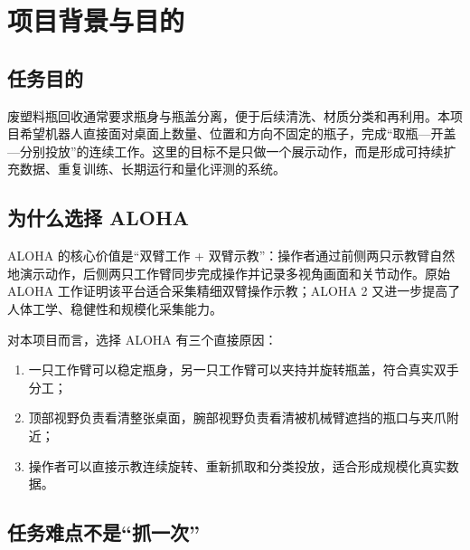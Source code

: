 \chapter{项目背景与目的}

\section{任务目的}

废塑料瓶回收通常要求瓶身与瓶盖分离，便于后续清洗、材质分类和再利用。本项目希望机器人直接面对桌面上数量、位置和方向不固定的瓶子，完成“取瓶—开盖—分别投放”的连续工作。这里的目标不是只做一个展示动作，而是形成可持续扩充数据、重复训练、长期运行和量化评测的系统。


\section{为什么选择 ALOHA}

ALOHA 的核心价值是“双臂工作 + 双臂示教”：操作者通过前侧两只示教臂自然地演示动作，后侧两只工作臂同步完成操作并记录多视角画面和关节动作。原始 ALOHA 工作证明该平台适合采集精细双臂操作示教；ALOHA 2 又进一步提高了人体工学、稳健性和规模化采集能力\cite{zhao2023aloha,aloha2_2024}。

对本项目而言，选择 ALOHA 有三个直接原因：

\begin{enumerate}
  \item 一只工作臂可以稳定瓶身，另一只工作臂可以夹持并旋转瓶盖，符合真实双手分工；
  \item 顶部视野负责看清整张桌面，腕部视野负责看清被机械臂遮挡的瓶口与夹爪附近；
  \item 操作者可以直接示教连续旋转、重新抓取和分类投放，适合形成规模化真实数据。
\end{enumerate}


\section{任务难点不是“抓一次”}


